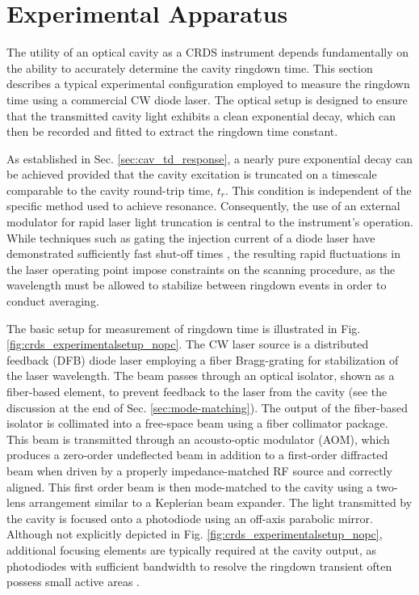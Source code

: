 \documentclass[8pt,a4paper]{report}
\begin{document}
	\section{Experimental Apparatus} \label{sec:crds_ringdown_meas}
	The utility of an optical cavity as a CRDS instrument depends fundamentally on the ability to accurately determine the cavity ringdown time. This section describes a typical experimental configuration employed to measure the ringdown time using a commercial CW diode laser. The optical setup is designed to ensure that the transmitted cavity light exhibits a clean exponential decay, which can then be recorded and fitted to extract the ringdown time constant.
	
	As established in Sec. \ref{sec:cav_td_response}, a nearly pure exponential decay can be achieved provided that the cavity excitation is truncated on a timescale comparable to the cavity round-trip time, $t_r$. This condition is independent of the specific method used to achieve resonance. Consequently, the use of an external modulator for rapid laser light truncation is central to the instrument's operation. While techniques such as gating the injection current of a diode laser have demonstrated sufficiently fast shut-off times \cite{wang_multispecies}, the resulting rapid fluctuations in the laser operating point impose constraints on the scanning procedure, as the wavelength must be allowed to stabilize between ringdown events in order to conduct averaging.
	
	The basic setup for measurement of ringdown time is illustrated in Fig. \ref{fig:crds_experimentalsetup_nopc}. The CW laser source is a distributed feedback (DFB) diode laser employing a fiber Bragg-grating for stabilization of the laser wavelength. The beam passes through an optical isolator, shown as a fiber-based element, to prevent feedback to the laser from the cavity (see the discussion at the end of Sec. \ref{sec:mode-matching}). The output of the fiber-based isolator is collimated into a free-space beam using a fiber collimator package. This beam is transmitted through an acousto-optic modulator (AOM), which produces a zero-order undeflected beam in addition to a first-order diffracted beam when driven by a properly impedance-matched RF source and correctly aligned. This first order beam is then mode-matched to the cavity using a two-lens arrangement similar to a Keplerian beam expander. The light transmitted by the cavity is focused onto a photodiode using an off-axis parabolic mirror.  Although not explicitly depicted in Fig. \ref{fig:crds_experimentalsetup_nopc}, additional focusing elements are typically required at the cavity output, as photodiodes with sufficient bandwidth to resolve the ringdown transient often possess small active areas \cite{Horowitz_ArtOfElectronics}.
	
\end{document}
